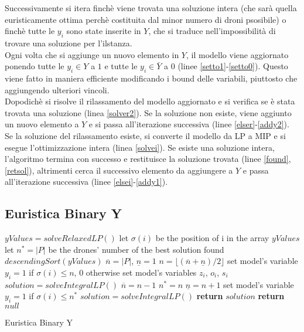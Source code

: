 Successivamente si itera finchè viene trovata una soluzione intera (che sarà quella euristicamente ottima perchè costituita dal minor numero di droni psosibile) o finchè tutte le $y_i$ sono state inserite in $Y$, che si traduce nell'impossibilità di trovare una soluzione per l'ilstanza.\\
Ogni volta che si aggiunge un nuovo elemento in $Y$, il modello viene aggiornato ponendo tutte le $y_i \in Y$ a $1$ e tutte le $y_i \in \bar{Y}$ a $0$ (linee \ref{setto1}-\ref{setto0}). Questo viene fatto in maniera efficiente modificando i bound delle variabili, piuttosto che aggiungendo ulteriori vincoli. \\
Dopodichè si risolve il rilassamento del modello aggiornato e si verifica se è stata trovata una soluzione (linea \ref{solver2}). 
Se la soluzione non esiste, viene aggiunto un nuovo elemento a $Y$ e si passa all'iterazione successiva (linee \ref{elser}-\ref{addy2}). \\
Se la soluzione del rilassamento esiste, si converte il modello da LP a MIP e si esegue l'ottimizzazione intera (linea \ref{solvei}).
Se esiste una soluzione intera, l'algoritmo termina con successo e restituisce la soluzione trovata (linee \ref{found},\ref{retsol}), altrimenti cerca il successivo elemento da aggiungere a $Y$ e passa all'iterazione successiva (linee \ref{elsei}-\ref{addy1}).

\subsection{Euristica Binary Y}
\begin{algorithm}
	\begin{algorithmic}[1]
		\State $yValues = solveRelaxedLP()$ \label{Bsolver1}
		\State let $\sigma(i)$ be the position of i in the array $yValues$
		\State let $n^* = |P| $ be the drones' number of the best solution found
		\State $descendingSort(yValues)$ \label{stInLP}
		\State $\overline{n} =|P|$,  $\underline{n} = 1$ \label{Binit}
		 \label{Bwhile}
			\State $n = \lfloor (\overline{n} + \underline{n}) / 2 \rfloor$ 
			\State set model's variable $y_i = 1$ if $\sigma(i) \leq n$, 0 otherwise \label{stFixY}  
			\State set model's variables $z_i$, $o_i$, $s_i$
			\State $solution = solveIntegralLP()$ \label{Bsolvei}
			 \label{stNewN}
				\State $\overline{n} = n -1$
					\State $n^* = n$ \label{bestsol}
				\EndIf
			\Else
				\State $\underline{n} = n + 1$ \label{Bendset}
			\EndIf	
		\EndWhile
		\State set model's variable $y_i = 1$ if $\sigma(i) \leq n^*$ \label{stPost}
		\State $solution = solveIntegralLP()$ 
		 \label{Bifsolved}
			\State \textbf{return} $solution$ \label{Bretsol}
		\Else
			\State \textbf{return} $null$
		\EndIf
			
	\end{algorithmic}
	\caption{Euristica Binary Y\label{alg:Binheuristic}}
\end{algorithm}

